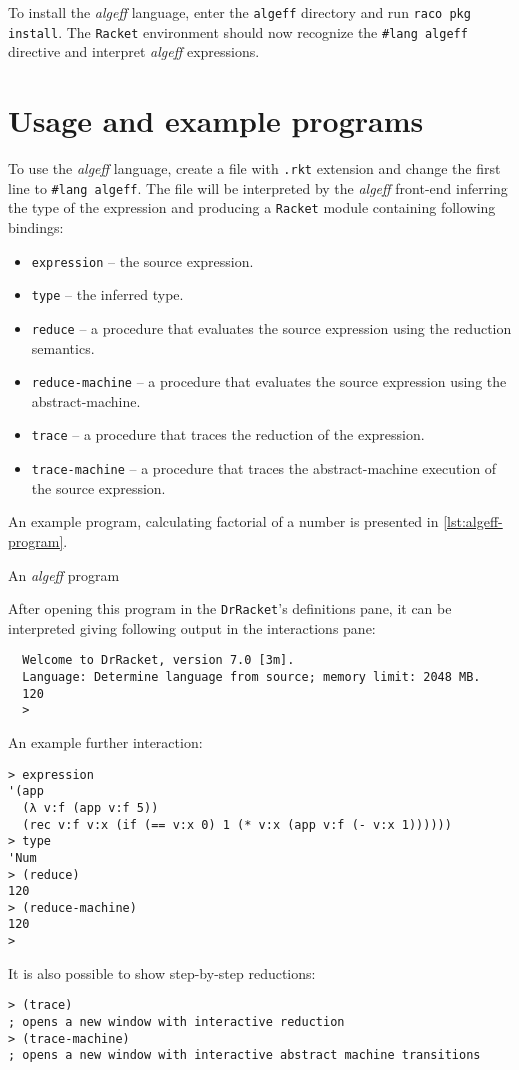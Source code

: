 \documentclass[inz, english, longabstract]{iithesis}
\newcommand{\Racket}{\texttt{Racket}}
\begin{document}
To install the \emph{algeff} language, enter the \texttt{algeff} directory and run \texttt{raco pkg install}.
The \Racket{} environment should now recognize the \texttt{\#lang algeff} directive and interpret \emph{algeff} expressions.

\section{Usage and example programs}
To use the \emph{algeff} language, create a file with \texttt{.rkt} extension and change the first line to \texttt{\#lang algeff}.
The file will be interpreted by the \emph{algeff} front-end inferring the type of the expression and producing a \Racket{} module containing following bindings:
\begin{itemize}
  \item \texttt{expression} -- the source expression.
  \item \texttt{type} -- the inferred type.
  \item \texttt{reduce} -- a procedure that evaluates the source expression using the reduction semantics.
  \item \texttt{reduce-machine} -- a procedure that evaluates the source expression using the abstract-machine.
  \item \texttt{trace} -- a procedure that traces the reduction of the expression.
  \item \texttt{trace-machine} -- a procedure that traces the abstract-machine execution of the source expression.
\end{itemize}

An example program, calculating factorial of a number is presented in \autoref{lst:algeff-program}.
\begin{listing}[t]
  \caption{An \emph{algeff} program}
  \label{lst:algeff-program}
\end{listing}
After opening this program in the \texttt{DrRacket}'s definitions pane, it can be interpreted giving following output in the interactions pane:
\begin{verbatim}
  Welcome to DrRacket, version 7.0 [3m].
  Language: Determine language from source; memory limit: 2048 MB.
  120
  >
\end{verbatim}
An example further interaction:
\begin{verbatim}
> expression
'(app
  (λ v:f (app v:f 5))
  (rec v:f v:x (if (== v:x 0) 1 (* v:x (app v:f (- v:x 1))))))
> type
'Num
> (reduce)
120
> (reduce-machine)
120
>
\end{verbatim} 
It is also possible to show step-by-step reductions:
\begin{verbatim}
> (trace)
; opens a new window with interactive reduction
> (trace-machine)
; opens a new window with interactive abstract machine transitions
\end{verbatim}
\end{document}
